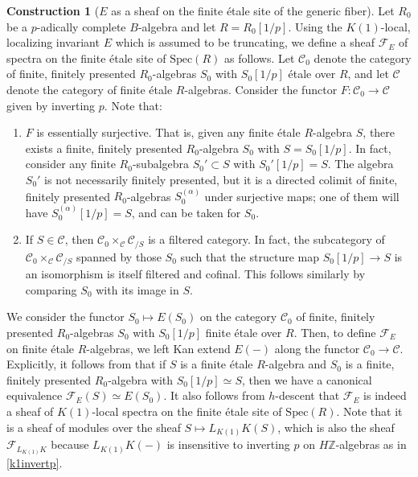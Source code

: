 \documentclass{amsart}
\newcommand{\sF}{\mathcal{F}}
\theoremstyle{definition}
\newtheorem{construction}[theorem]{Construction}
\newcommand{\spec}{\mathrm{Spec}}
\begin{document}
\begin{construction}[$ E$ as a sheaf on the finite \'etale site of the generic fiber]
Let $R_0$ be a $p$-adically complete $B$-algebra and let $R = R_0[1/p]$. 
Using the $K(1)$-local, localizing invariant $E$ which is assumed to
be truncating, we define a sheaf $\sF_E$ of spectra on the finite \'etale 
site of $\spec(R)$ as follows. 
Let
$\mathcal{C}_0$ denote the category of finite, finitely presented
$R_0$-algebras $S_0$ with $S_0[1/p]$ \'etale over $R$, and let $\mathcal{C}$
denote the category of finite \'etale $R$-algebras. 
Consider the functor $F\colon  \mathcal{C}_0 \to \mathcal{C}$ given by inverting $p$.
Note that: 
\begin{enumerate}
\item $ F$ is essentially surjective. 
That is, given any finite \'etale $R$-algebra $S$, there exists a finite,
finitely presented $R_0$-algebra $S_0$ with $S = S_0[1/p]$. 
In fact, consider 
any finite $R_0$-subalgebra $S_0' \subset S$ with $S_0'[1/p] = S$.
The algebra $S_0'$ is not necessarily finitely presented, but it is a directed
colimit of finite, finitely presented $R_0$-algebras $S_0^{(\alpha)}$ under surjective maps; one of
them will have $S_0^{(\alpha)}[1/p] = S$, and can be taken for $S_0$. 
\item If $S \in \mathcal{C}$, then $\mathcal{C}_0
\times_{\mathcal{C}}\mathcal{C}_{/S}$ is a filtered category. 
In fact, 
the subcategory of 
$\mathcal{C}_0
\times_{\mathcal{C}}\mathcal{C}_{/S}$ spanned by those $S_0$ such that the
structure map $S_0[1/p] \to S$ is an isomorphism is itself filtered and cofinal. 
This follows similarly by comparing $S_0$ with its image in $S$.
\end{enumerate}



We consider the functor 
$S_0 \mapsto E(S_0)$ on the category $\mathcal{C}_0$ of finite, finitely presented
$R_0$-algebras $S_0$ with $S_0[1/p]$ finite \'etale over $R$. 
Then, to define $\sF_E$ on 
finite \'etale $R$-algebras, 
we left Kan extend $E(-)$ along the functor $\mathcal{C}_0 \to \mathcal{C}$. 
Explicitly, it follows 
from 
that if $S$ is a finite \'etale $R$-algebra and 
$S_0$ is a finite, finitely presented $R_0$-algebra with $S_0[1/p] \simeq S$,
then 
we have a canonical equivalence
$\sF_E(S) \simeq E(S_0)$. 
It also follows from $h$-descent that 
$\sF_E$ is indeed a sheaf of $K(1)$-local spectra on the finite \'etale site of
$\spec(R)$. 
Note that it is a sheaf of modules over the sheaf $S \mapsto L_{K(1)} K(S)$,
which is also the sheaf $\sF_{L_{K(1)} K}$  because $L_{K(1)} K(-)$ is insensitive
to inverting $p$ on $H\mathbb{Z}$-algebras as in 
\eqref{k1invertp}. 

\end{construction} 
\end{document}
